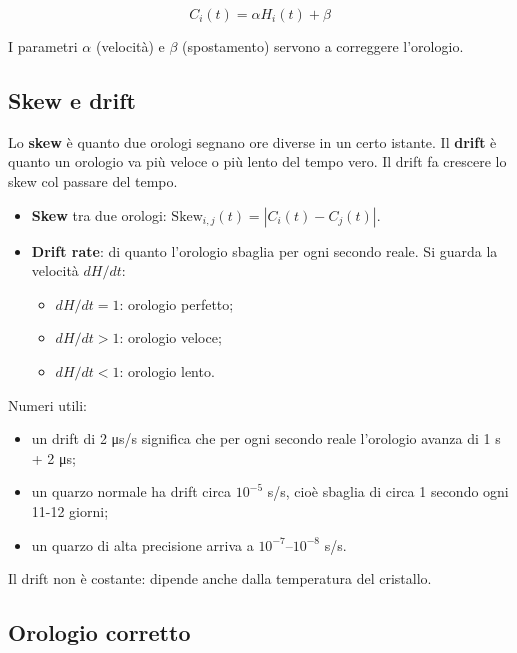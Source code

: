 \[
C_i(t) = \alpha H_i(t) + \beta
\]

I parametri \(\alpha\) (velocità) e \(\beta\) (spostamento) servono a correggere l'orologio.

\subsection{Skew e drift}

\begin{inbreve}

Lo \textbf{skew} è quanto due orologi segnano ore diverse in un certo istante. Il \textbf{drift} è quanto un orologio va più veloce o più lento del tempo vero. Il drift fa crescere lo skew col passare del tempo.

\end{inbreve}

\begin{itemize}
\tightlist
\item
  \textbf{Skew} tra due orologi: \(\text{Skew}_{i,j}(t) = |C_i(t) - C_j(t)|\).
\item
  \textbf{Drift rate}: di quanto l'orologio sbaglia per ogni secondo reale. Si guarda la velocità \(dH/dt\):

  \begin{itemize}
  \tightlist
  \item
    \(dH/dt = 1\): orologio perfetto;
  \item
    \(dH/dt > 1\): orologio veloce;
  \item
    \(dH/dt < 1\): orologio lento.
  \end{itemize}
\end{itemize}

Numeri utili:

\begin{itemize}
\tightlist
\item
  un drift di 2 μs/s significa che per ogni secondo reale l'orologio avanza di 1 s + 2 μs;
\item
  un quarzo normale ha drift circa \(10^{-5}\) s/s, cioè sbaglia di circa 1 secondo ogni 11-12 giorni;
\item
  un quarzo di alta precisione arriva a \(10^{-7}\)--\(10^{-8}\) s/s.
\end{itemize}

Il drift non è costante: dipende anche dalla temperatura del cristallo.

\subsection{Orologio corretto}

